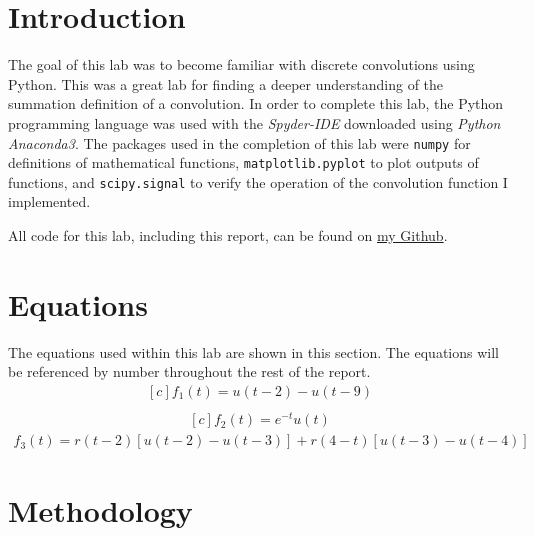 \documentclass[12pt]{report}
\begin{document}
\section{Introduction}
The goal of this lab was to become familiar with discrete convolutions using Python. This was a great lab for finding a deeper understanding of the summation definition
of a convolution. In order to complete this lab, the Python programming language was used with the \textit{Spyder-IDE} downloaded using \textit{Python Anaconda3}. The packages used in the 
completion of this lab were \texttt{numpy} for definitions of mathematical functions, \texttt{matplotlib.pyplot} to plot outputs of functions, and \texttt{scipy.signal} to verify the 
operation of the convolution function I implemented. 

All code for this lab, including this report, can be found on \href{http://github.com/mac-edmondson}{my Github}.
\section{Equations}
The equations used within this lab are shown in this section. The equations will be referenced by number throughout the rest of the report.
\begin{equation}\label{eq: 1}
  \begin{aligned}[c]
    f_1(t) = u(t-2) - u(t-9)\\
  \end{aligned}
\end{equation}
\begin{equation}\label{eq: 2}
  \begin{aligned}[c]
    f_2(t) = e^{-t} u(t)
  \end{aligned}
\end{equation}
\begin{equation}\label{eq: 3}
  \begin{aligned}
    f_3(t) = r(t-2) [u(t-2)-u(t-3)] + r(4-t) [u(t-3) - u(t-4)]
  \end{aligned}
\end{equation}

\section{Methodology}
\end{document}
